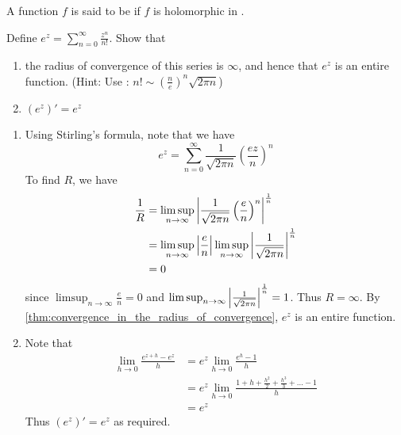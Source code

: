 \documentclass[notoc,notitlepage]{tufte-book}
\begin{document}
\begin{defn}
	A function $f$ is said to be  if $f$ is holomorphic in .
\end{defn}

\begin{ex}
	Define $e^z = \sum_{n=0}^{\infty} \frac{z^n}{n!}$. Show that
	\begin{enumerate}
		\item the radius of convergence of this series is $\infty$, and hence that $e^z$ is an entire function. (Hint: Use : $n! \sim (\frac{n}{e})^n \sqrt{2 \pi n}$)
		\item $(e^z)' = e^z$
	\end{enumerate}

	\begin{solution}
		\begin{enumerate}
			\item Using Stirling's formula, note that we have
			\begin{equation*}
				e^z = \sum_{n=0}^{\infty} \frac{1}{\sqrt{2 \pi n}} \left(\frac{ez}{n} \right)^n
			\end{equation*}
			To find $R$, we have
			\begin{align*}
				\frac{1}{R} &= \limsup_{n \to \infty} \left|\frac{1}{\sqrt{2 \pi n}} \left(\frac{e}{n} \right)^n \right|^\frac{1}{n} \\
					&= \limsup_{n \to \infty} \left|\frac{e}{n}\right| \limsup_{n \to \infty} \left|\frac{1}{\sqrt{2 \pi n}}\right|^\frac{1}{n} \\
					&= 0
			\end{align*}
			since $\limsup_{n \to \infty} \frac{e}{n} = 0$ and $\limsup_{n \to \infty} \left|\frac{1}{\sqrt{2 \pi n}}\right|^\frac{1}{n} = 1$. Thus $R = \infty$. By \cref{thm:convergence_in_the_radius_of_convergence}, $e^z$ is an entire function.

			\item Note that
			\begin{align*}
				\lim_{h \to 0} \frac{e^{z + h} - e^z}{h} &= e^z \lim_{h \to 0} \frac{e^h - 1}{h}  \\
					&= e^z \lim_{h \to 0} \frac{1 + h + \frac{h^2}{2} + \frac{h^3}{3} + \hdots - 1}{h} \\
					&= e^z
			\end{align*}
			Thus $(e^z)' = e^z$ as required.
		\end{enumerate}
	\end{solution}
\end{ex}
\end{document}
